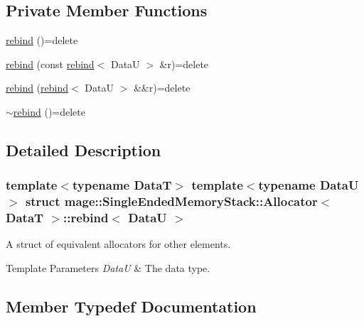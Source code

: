 \subsection*{Private Member Functions}
\begin{DoxyCompactItemize}
\item 
\hyperlink{structmage_1_1_single_ended_memory_stack_1_1_allocator_1_1rebind_a4ba91415d43d61d53cd997be987edcbc}{rebind} ()=delete
\item 
\hyperlink{structmage_1_1_single_ended_memory_stack_1_1_allocator_1_1rebind_af8761e57c718fe852e4b36e897a28534}{rebind} (const \hyperlink{structmage_1_1_single_ended_memory_stack_1_1_allocator_1_1rebind}{rebind}$<$ DataU $>$ \&r)=delete
\item 
\hyperlink{structmage_1_1_single_ended_memory_stack_1_1_allocator_1_1rebind_a7101dfb156adee57b41648a4ab96e3a4}{rebind} (\hyperlink{structmage_1_1_single_ended_memory_stack_1_1_allocator_1_1rebind}{rebind}$<$ DataU $>$ \&\&r)=delete
\item 
\hyperlink{structmage_1_1_single_ended_memory_stack_1_1_allocator_1_1rebind_ac5560de51fdd40828b0b82f7975199d1}{$\sim$rebind} ()=delete
\end{DoxyCompactItemize}


\subsection{Detailed Description}
\subsubsection*{template$<$typename DataT$>$\newline
template$<$typename DataU$>$\newline
struct mage\+::\+Single\+Ended\+Memory\+Stack\+::\+Allocator$<$ Data\+T $>$\+::rebind$<$ Data\+U $>$}

A struct of equivalent allocators for other elements.


\begin{DoxyTemplParams}{Template Parameters}
{\em DataU} & The data type. \\
\hline
\end{DoxyTemplParams}


\subsection{Member Typedef Documentation}
\hypertarget{structmage_1_1_single_ended_memory_stack_1_1_allocator_1_1rebind_a8046a39ba6854ffa75978d58b0aafa02}{}\label{structmage_1_1_single_ended_memory_stack_1_1_allocator_1_1rebind_a8046a39ba6854ffa75978d58b0aafa02} 
